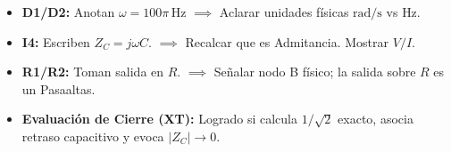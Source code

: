 \documentclass[11pt, a4paper]{article}
\begin{document}
\vspace{0.2cm}
\begin{tcolorbox}[colback=gray!5, colframe=black, title=\textbf{Rúbrica Cualitativa y Errores (Diagnóstico Formativo)}]
\small
\begin{itemize}
    \item \textbf{D1/D2:} Anotan $\omega = 100\pi\,\text{Hz}$ $\implies$ Aclarar unidades físicas $\text{rad/s}$ vs $\text{Hz}$.
    \item \textbf{I4:} Escriben $Z_C = j\omega C$. $\implies$ Recalcar que es Admitancia. Mostrar $V/I$.
    \item \textbf{R1/R2:} Toman salida en $R$. $\implies$ Señalar nodo B físico; la salida sobre $R$ es un Pasaaltas.
    \item \textbf{Evaluación de Cierre (XT):} Logrado si calcula $1/\sqrt{2}$ exacto, asocia retraso capacitivo y evoca $|Z_C| \to 0$.
\end{itemize}
\end{tcolorbox}
\end{document}

